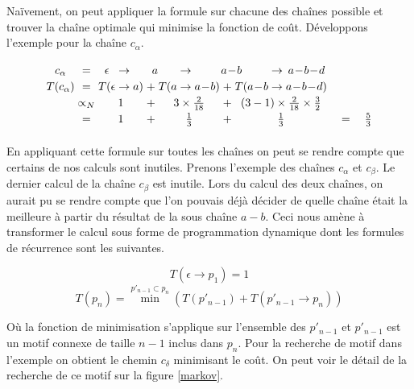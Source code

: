 \documentclass[12pt,french,twoside]{report}
\begin{document}
Naïvement, on peut appliquer la formule sur chacune des chaînes possible et trouver la chaîne optimale qui minimise la fonction de
coût. Développons l'exemple pour la chaîne $c_{\alpha}$.

\[
\arraycolsep=1.4pt\def\arraystretch{1.2}
\begin{array}{cccccccccccccc}
  c_\alpha    & =  & \epsilon &  \rightarrow &  \multicolumn{3}{c}{a} & \rightarrow & \multicolumn{3}{c}{a\!-\!b} &  \rightarrow & \multicolumn{1}{c}{a\!-\!b\!-\!d} &\\
  T(c_\alpha)   & =  & T( \epsilon &  \rightarrow &  a)  & + & T( a &  \rightarrow  & a\!-\!b) & + & T(a\!-\!b &  \rightarrow & a\!-\!b\!-\!d) &\\
                    & \propto_{N}  &  \multicolumn{3}{c}{1} &  + & \multicolumn{3}{c}{3 \times \frac{2}{18}} & + & \multicolumn{3}{c}{  (3-1)\times \frac{2}{18} \times \frac{3}{2}} &\\
                    & = &  \multicolumn{3}{c}{1} &  + & \multicolumn{3}{c}{\frac{1}{3}} & + & \multicolumn{3}{c}{\frac{1}{3}}   & \quad= \quad\frac{5}{3} \\

\end{array}
\]

\paragraph{}En appliquant cette formule sur toutes les chaînes on peut se rendre compte que certains de nos calculs sont inutiles.
Prenons l'exemple des chaînes $c_{\alpha}$ et $c_{\beta}$. Le dernier calcul de la chaîne $c_{\beta}$ est inutile. Lors
du calcul des deux chaînes, on aurait pu se rendre compte que l'on pouvais déjà décider de quelle chaîne était la meilleure à
partir du résultat de la sous chaîne $a-b$. Ceci nous amène à transformer le calcul sous forme de programmation dynamique dont les
formules de récurrence sont les suivantes.


\begin{equation}
 T(\epsilon \rightarrow p_1) = 1
\end{equation}
\begin{equation}
 T(p_n) = \min^{p'_{n-1} \subset p_n} (T(p'_{n-1}) + T(p'_{n-1} \rightarrow p_n))
\end{equation}

Où la fonction de minimisation s'applique sur l'ensemble des $p'_{n-1}$ et $p'_{n-1}$ est un motif connexe de taille $n-1$ inclus
dans $p_n$. Pour la recherche de motif dans l'exemple on obtient le chemin $c_{\delta}$ minimisant le coût. On peut voir le
détail de la recherche de ce motif sur la figure \ref{markov}.
\end{document}
